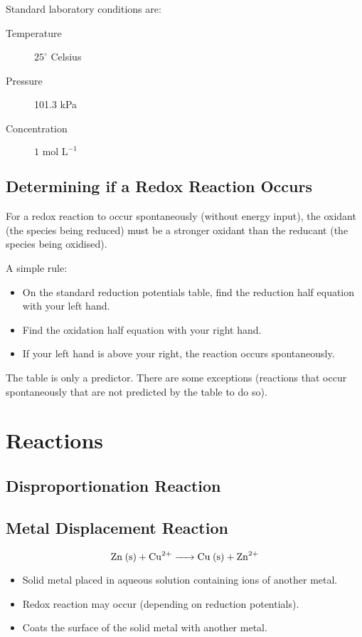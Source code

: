 \documentclass[a4paper,11pt]{article}
\begin{document}
Standard laboratory conditions are:

\begin{description}
\item [Temperature] $25^\circ$ Celsius
\item [Pressure] 101.3 kPa
\item [Concentration] $1\text{ mol L}^{-1}$
\end{description}

\subsection{Determining if a Redox Reaction Occurs}

For a redox reaction to occur spontaneously (without energy input), the oxidant
(the species being reduced) must be a stronger oxidant than the reducant (the
species being oxidised).

A simple rule:

\begin{itemize}
\item On the standard reduction potentials table, find the reduction half
	equation with your left hand.
\item Find the oxidation half equation with your right hand.
\item If your left hand is above your right, the reaction occurs spontaneously.
\end{itemize}

The table is only a predictor. There are some exceptions (reactions that occur
spontaneously that are not predicted by the table to do so).



\section{Reactions}

\subsection{Disproportionation Reaction}

\subsection{Metal Displacement Reaction}

$$
\ce{Zn (s) + Cu^{2+} -> Cu (s) + Zn^{2+}}
$$

\begin{itemize}
\item Solid metal placed in aqueous solution containing ions of another metal.
\item Redox reaction may occur (depending on reduction potentials).
\item Coats the surface of the solid metal with another metal.
\end{itemize}
\end{document}
